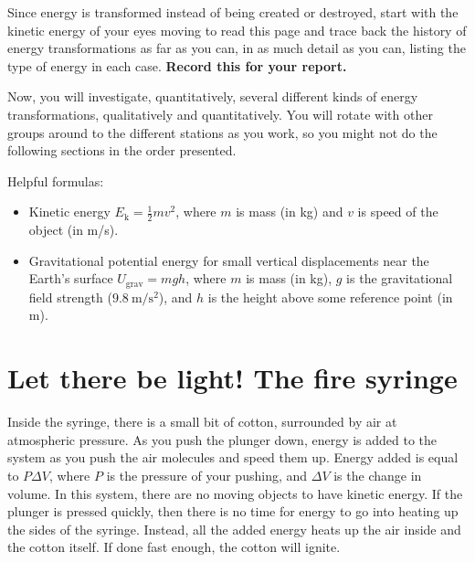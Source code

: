 
\begin{steps}
	\item Since energy is transformed instead of being created or destroyed, start with the kinetic energy of your eyes moving to read this page and trace back the history of energy transformations as far as you can, in as much detail as you can, listing the type of energy in each case. \textbf{Record this for your report.}
\end{steps}

\begin{framed}
Now, you will investigate, quantitatively, several different kinds of energy transformations, qualitatively and quantitatively. You will rotate with other groups around to the different stations as you work, so you might not do the following sections in the order presented.
\end{framed}

Helpful formulas:
\begin{itemize}
	\item Kinetic energy $E_\textrm{k} = \frac{1}{2} m v^2$, where $m$ is mass (in kg) and $v$ is speed of the object (in m/s).
	
	\item Gravitational potential energy for small vertical displacements near the Earth's surface $U_\textrm{grav} = m g h$, where $m$ is mass (in kg), $g$ is the gravitational field strength ($9.8\:\textrm{m}/\textrm{s}^2$), and $h$ is the height above some reference point (in m).
\end{itemize}

\section{Let there be light! The fire syringe}

Inside the syringe, there is a small bit of cotton, surrounded by air at atmospheric pressure. As you push the plunger down, energy is added to the system as you push the air molecules and speed them up. Energy added is equal to $P \Delta V$, where $P$ is the pressure of your pushing, and $\Delta V$ is the change in volume. In this system, there are no moving objects to have kinetic energy. If the plunger is pressed quickly, then there is no time for energy to go into heating up the sides of the syringe. Instead, all the added energy heats up the air inside and the cotton itself. If done fast enough, the cotton will ignite.

